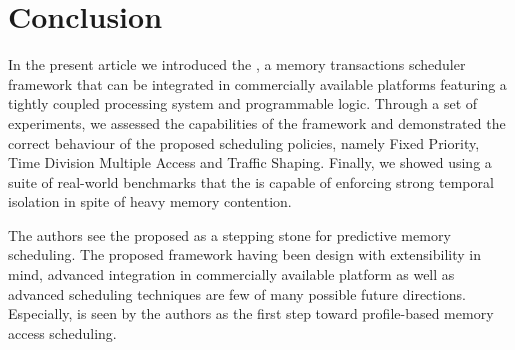 \section{Conclusion}
    
In the present article we introduced the \schim, a memory transactions
scheduler framework that can be integrated in commercially available
platforms featuring a tightly coupled processing system and
programmable logic. Through a set of experiments, we assessed the
capabilities of the framework and demonstrated the correct behaviour
of the proposed scheduling policies, namely Fixed Priority, Time
Division Multiple Access and Traffic Shaping. Finally, we showed using
a suite of real-world benchmarks that the \schim is capable of
enforcing strong temporal isolation in spite of heavy memory
contention.
    
The authors see the proposed \schim as a stepping stone for predictive
memory scheduling. The proposed framework having been design with
extensibility in mind, advanced integration in commercially available
platform as well as advanced scheduling techniques are few of many
possible future directions. Especially, \schim is seen by the authors
as the first step toward profile-based memory access scheduling.
